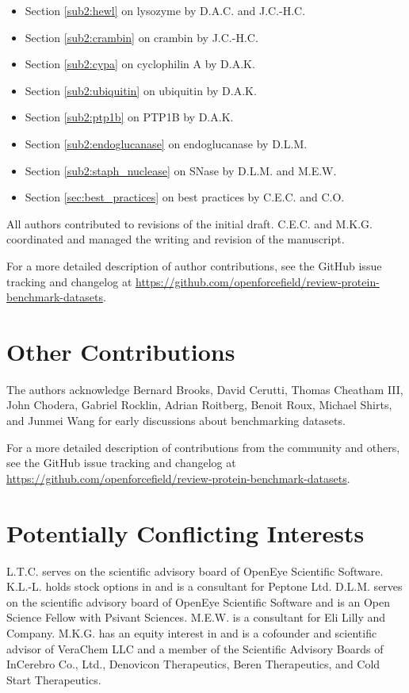 \documentclass[9pt,review,pubversion]{livecoms}
\newcommand{\githubrepository}{\url{https://github.com/openforcefield/review-protein-benchmark-datasets}}  %
\begin{document}
\begin{itemize}
    \item Section \ref{sub2:hewl} on lysozyme by D.A.C. and J.C.-H.C.
    \item Section \ref{sub2:crambin} on crambin by J.C.-H.C.
    \item Section \ref{sub2:cypa} on cyclophilin A by D.A.K.
    \item Section \ref{sub2:ubiquitin} on ubiquitin by D.A.K.
    \item Section \ref{sub2:ptp1b} on PTP1B by D.A.K.
    \item Section \ref{sub2:endoglucanase} on endoglucanase by D.L.M.
    \item Section \ref{sub2:staph_nuclease} on SNase by D.L.M. and M.E.W.
    \item Section \ref{sec:best_practices} on best practices by C.E.C. and C.O.
\end{itemize}
All authors contributed to revisions of the initial draft.
C.E.C. and M.K.G. coordinated and managed the writing and revision of the manuscript.

For a more detailed description of author contributions, see the GitHub issue tracking and changelog at \githubrepository.

\section*{Other Contributions}

The authors acknowledge Bernard Brooks, David Cerutti, Thomas Cheatham III, John Chodera, Gabriel Rocklin, Adrian Roitberg, Benoit Roux, Michael Shirts, and Junmei Wang for early discussions about benchmarking datasets.

For a more detailed description of contributions from the community and others, see the GitHub issue tracking and changelog at \githubrepository.

\section*{Potentially Conflicting Interests}

L.T.C. serves on the scientific advisory board of OpenEye Scientific Software.
K.L.-L. holds stock options in and is a consultant for Peptone Ltd.
D.L.M. serves on the scientific advisory board of OpenEye Scientific Software and is an Open Science Fellow with Psivant Sciences.
M.E.W. is a consultant for Eli Lilly and Company.
M.K.G. has an equity interest in and is a cofounder and scientific advisor of VeraChem LLC and a member of the Scientific Advisory Boards of InCerebro Co., Ltd., Denovicon Therapeutics, Beren Therapeutics, and Cold Start Therapeutics.
\end{document}
